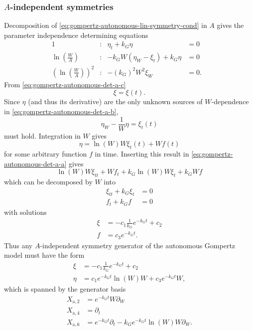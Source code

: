 \subsubsection{\texorpdfstring{\(A\)-independent symmetries}{Carrying capacity-independent symmetries}}

Decomposition of \cref{eq:gompertz-autonomous-lin-symmetry-cond} in \(A\) gives the parameter independence determining equations
\begin{subequations}
  \begin{flalign}
    1 & : & \eta_t + k_G \eta &= 0 &\label{eq:gompertz-autonomous-det-a-a}\\
    \ln(\frac{W}{A}) & : & - k_G W\left(\eta_W - \xi_t\right)  + k_G \eta &= 0 &\label{eq:gompertz-autonomous-det-a-b}\\
    \left(\ln(\frac{W}{A})\right)^2 & : & - (k_G)^2 W^2 \xi_W &= 0. &\label{eq:gompertz-autonomous-det-a-c}
  \end{flalign}
\end{subequations}
From \cref{eq:gompertz-autonomous-det-a-c}
\begin{equation*}
  \xi = \xi(t).
\end{equation*}
Since \(\eta\) (and thus its derivative) are the only unknown sources of \(W\)-dependence in \cref{eq:gompertz-autonomous-det-a-b},
\begin{equation*}
  \eta_W - \frac{1}{W}\eta = \xi_t(t)
\end{equation*}
must hold.
Integration in \(W\) gives
\begin{equation*}
  \eta = \ln(W) W \xi_t(t) + W f(t)
\end{equation*}
for some arbitrary function \(f\) in time.
Inserting this result in \cref{eq:gompertz-autonomous-det-a-a} gives
\begin{equation*}
  \ln(W) W \xi_{tt} + W f_t + k_G \ln(W) W \xi_t + k_G W f
\end{equation*}
which can be decomposed by \(W\) into
\begin{align*}
  \xi_{tt} + k_G \xi_t &= 0 \\
  f_t + k_G f &= 0
\end{align*}
with solutions
\begin{align*}
  \xi &= - c_1 \frac{1}{k_G} e^{-k_G t} + c_2 \\
  f &= c_3 e^{-k_G t}.
\end{align*}
Thus any \(A\)-independent symmetry generator of the autonomous Gompertz model  must have the form
\begin{align*}
  \xi &= - c_1 \frac{1}{k_G} e^{-k_G t} + c_2 \\
  \eta &= c_1 e^{-k_G t} \ln(W) W  + c_3 e^{-k_G t} W,
\end{align*}
which is spanned by the generator basis
\begin{align*}
  X_{\text{a},2} &= e^{-k_G t} W \partial_W \\
  X_{\text{a},4} &= \partial_t \\
  X_{\text{a},6} &= e^{-k_G t} \partial_t - k_G e^{-k_G t} \ln(W) W \partial_W.
\end{align*}

